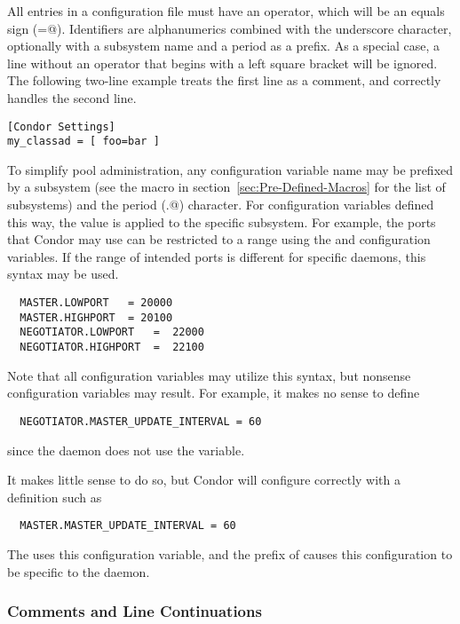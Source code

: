 All entries in a configuration file must have an operator,
which will be an equals sign (\verb@=@).
Identifiers are alphanumerics combined with the underscore character,
optionally with a subsystem name and a period as a prefix.
As a special case,
a line without an operator that begins with a left square bracket
will be ignored.
The following two-line example treats the first line as a comment,
and correctly handles the second line.
\begin{verbatim}
[Condor Settings]
my_classad = [ foo=bar ]
\end{verbatim}

To simplify pool administration,
any configuration variable name may be prefixed by
a subsystem 
(see the  macro in 
section~\ref{sec:Pre-Defined-Macros}
for the list of subsystems)
and the period (\verb@.@) character.
For configuration variables defined this way,
the value is applied to the specific subsystem.
For example,
the ports that Condor may use can be restricted to a range 
using the  and  configuration
variables.
If the range of intended ports is different for specific
daemons, this syntax may be used.
\begin{verbatim}
  MASTER.LOWPORT   = 20000
  MASTER.HIGHPORT  = 20100
  NEGOTIATOR.LOWPORT   =  22000 
  NEGOTIATOR.HIGHPORT  =  22100
\end{verbatim}

Note that all configuration variables may utilize this syntax,
but nonsense configuration variables may result.
For example, it makes no sense to define
\begin{verbatim}
  NEGOTIATOR.MASTER_UPDATE_INTERVAL = 60
\end{verbatim}
since the  daemon does not use the
 variable.

It makes little sense to do so, but Condor will configure
correctly with a definition such as
\begin{verbatim}
  MASTER.MASTER_UPDATE_INTERVAL = 60
\end{verbatim}
The  uses this configuration variable,
and the prefix of  causes this configuration
to be specific to the  daemon.


\subsubsection{\label{sec:Other-Syntax}Comments and Line Continuations}

